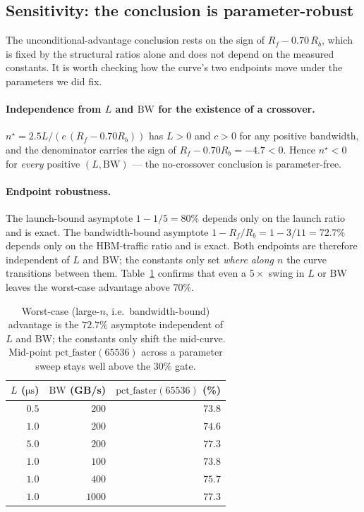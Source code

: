\documentclass[11pt,a4paper]{article}
\begin{document}
\subsection{Sensitivity: the conclusion is parameter-robust}
\label{sec:sensitivity}

The unconditional-advantage conclusion rests on the sign of
$R_f - 0.70\,R_b$, which is fixed by the structural ratios alone and does not
depend on the measured constants. It is worth checking how the curve's two
endpoints move under the parameters we did fix.

\paragraph{Independence from $L$ and $\mathrm{BW}$ for the existence of a crossover.}
$n^\star = 2.5L/(c\,(R_f-0.70R_b))$ has $L>0$ and $c>0$ for any positive
bandwidth, and the denominator carries the sign of $R_f-0.70R_b=-4.7<0$. Hence
$n^\star<0$ for \emph{every} positive $(L,\mathrm{BW})$ --- the no-crossover
conclusion is parameter-free.

\paragraph{Endpoint robustness.} The launch-bound asymptote $1-1/5=80\%$
depends only on the launch ratio and is exact. The bandwidth-bound asymptote
$1-R_f/R_b=1-3/11=72.7\%$ depends only on the HBM-traffic ratio and is exact.
Both endpoints are therefore independent of $L$ and $\mathrm{BW}$; the
constants only set \emph{where along $n$} the curve transitions between them.
Table~\ref{tab:sensitivity} confirms that even a $5\times$ swing in $L$ or
$\mathrm{BW}$ leaves the worst-case advantage above $70\%$.

\begin{table}[h]
\centering
\caption{Worst-case (large-$n$, i.e.\ bandwidth-bound) advantage is the
$72.7\%$ asymptote independent of $L$ and $\mathrm{BW}$; the constants only
shift the mid-curve. Mid-point $\mathrm{pct\_faster}(65536)$ across a
parameter sweep stays well above the $30\%$ gate.}
\label{tab:sensitivity}
\begin{tabular}{rrr}
\toprule
$L$ ($\si{\micro\second}$) & $\mathrm{BW}$ (\si{GB/s}) & $\mathrm{pct\_faster}(65536)$ (\%) \\
\midrule
$0.5$ & $200$ & $73.8$ \\
$1.0$ & $200$ & $74.6$ \\
$5.0$ & $200$ & $77.3$ \\
$1.0$ & $100$ & $73.8$ \\
$1.0$ & $400$ & $75.7$ \\
$1.0$ & $1000$ & $77.3$ \\
\bottomrule
\end{tabular}
\end{table}
\end{document}
